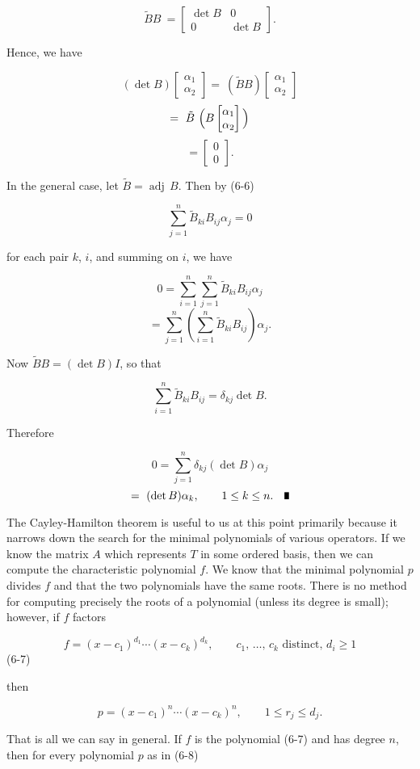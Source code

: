 \[\tilde{B}B\ =\begin{bmatrix}\det B&0\\ 0&\det B\end{bmatrix}.\]

Hence, we have

\[(\det B)\begin{bmatrix}\alpha_{1}\\ \alpha_{2}\end{bmatrix} =\ (\tilde{B}B)\begin{bmatrix}\alpha_{1}\\ \alpha_{2}\end{bmatrix}\] \[=\ \tilde{B}\ \Big{(}B\begin{bmatrix}\alpha_{1}\\ \alpha_{2}\end{bmatrix}\Big{)}\] \[=\begin{bmatrix}0\\ 0\end{bmatrix}.\]

In the general case, let \(\tilde{B}=\operatorname{adj}\,B\). Then by (6-6)

\[\sum_{j=1}^{n}\tilde{B}_{ki}B_{ij}\alpha_{j}=0\]

for each pair \(k\), \(i\), and summing on \(i\), we have

\[0 =\sum_{i=1}^{n}\sum_{j=1}^{n}\tilde{B}_{ki}B_{ij}\alpha_{j}\] \[=\sum_{j=1}^{n}\left(\sum_{i=1}^{n}\tilde{B}_{ki}B_{ij}\right) \alpha_{j}.\]

Now \(\tilde{B}B=(\det B)I\), so that

\[\sum_{i=1}^{n}\tilde{B}_{ki}B_{ij}=\delta_{kj}\det B.\]

Therefore

\[0 =\sum_{j=1}^{n}\delta_{kj}(\det B)\alpha_{j}\] \[=\ (\det B)\alpha_{k},\qquad 1\leq k\leq n.\quad\vrule height 6.0pt width 4.0pt depth 0.0pt\]

The Cayley-Hamilton theorem is useful to us at this point primarily because it narrows down the search for the minimal polynomials of various operators. If we know the matrix \(A\) which represents \(T\) in some ordered basis, then we can compute the characteristic polynomial \(f\). We know that the minimal polynomial \(p\) divides \(f\) and that the two polynomials have the same roots. There is no method for computing precisely the roots of a polynomial (unless its degree is small); however, if \(f\) factors

\[f=(x-c_{1})^{d_{1}}\cdots(x-c_{k})^{d_{k}},\qquad c_{1},\,\ldots,\,c_{k}\text{ distinct, }d_{i}\geq 1\] (6-7)

then

\[p=(x-c_{1})^{n}\cdots(x-c_{k})^{n},\qquad 1\leq r_{j}\leq d_{j}.\]

That is all we can say in general. If \(f\) is the polynomial (6-7) and has degree \(n\), then for every polynomial \(p\) as in (6-8) 